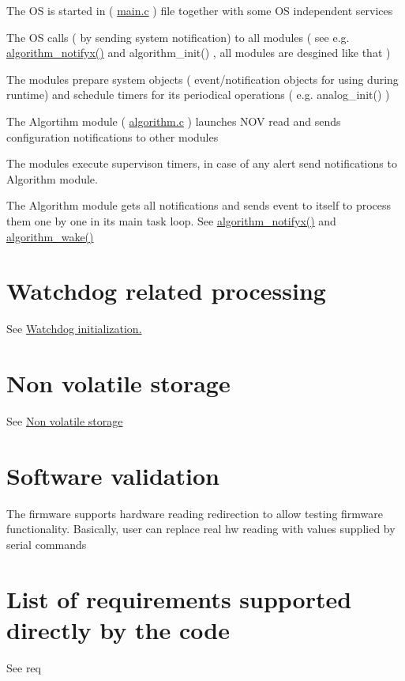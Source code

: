 \begin{DoxyItemize}
\item The O\+S is started in ( \hyperlink{a00048}{main.\+c} ) file together with some O\+S independent services
\item The O\+S calls ( by sending system notification) to all modules ( see e.\+g. \hyperlink{a00021_a93269cdec3e21934aa9395440a2de605}{algorithm\+\_\+notifyx()} and algorithm\+\_\+init() , all modules are desgined like that )
\item The modules prepare system objects ( event/notification objects for using during runtime) and schedule timers for its periodical operations ( e.\+g. analog\+\_\+init() )
\item The Algortihm module ( \hyperlink{a00038}{algorithm.\+c} ) launches N\+O\+V read and sends configuration notifications to other modules
\item The modules execute supervison timers, in case of any alert send notifications to Algorithm module.
\item The Algorithm module gets all notifications and sends event to itself to process them one by one in its main task loop. See \hyperlink{a00021_a93269cdec3e21934aa9395440a2de605}{algorithm\+\_\+notifyx()} and \hyperlink{a00016_a42ed16c7ef20e0c0031fe7ba7ae377b3}{algorithm\+\_\+wake()}
\end{DoxyItemize}\hypertarget{index_wdglist}{}\section{Watchdog related processing}\label{index_wdglist}
See \hyperlink{a00010}{Watchdog initialization.}\hypertarget{index_nov}{}\section{Non volatile storage}\label{index_nov}
See \hyperlink{a00006}{Non volatile storage}\hypertarget{index_hwio}{}\section{Software validation}\label{index_hwio}
The firmware supports hardware reading redirection to allow testing firmware functionality. Basically, user can replace real hw reading with values supplied by serial commands\hypertarget{index_requirements}{}\section{List of requirements supported directly by the code}\label{index_requirements}
See req 